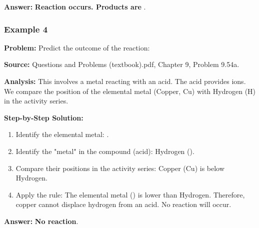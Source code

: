 \documentclass{article}
\begin{document}
\textbf{Answer:} \textbf{Reaction occurs. Products are }.

\subsubsection{Example 4}
\textbf{Problem:} Predict the outcome of the reaction: 

\textbf{Source:} Questions and Problems (textbook).pdf, Chapter 9, Problem 9.54a.

\textbf{Analysis:} This involves a metal reacting with an acid. The acid provides  ions. We compare the position of the elemental metal (Copper, Cu) with Hydrogen (H) in the activity series.

\textbf{Step-by-Step Solution:}
\begin{enumerate}
    \item Identify the elemental metal: .
    \item Identify the "metal" in the compound (acid): Hydrogen ().
    \item Compare their positions in the activity series: Copper (Cu) is below Hydrogen.
    \item Apply the rule: The elemental metal () is lower than Hydrogen. Therefore, copper cannot displace hydrogen from an acid. No reaction will occur.
\end{enumerate}

\textbf{Answer:} \textbf{No reaction}.
\end{document}
